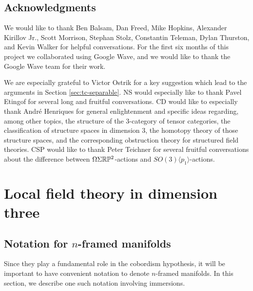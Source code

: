 \documentclass{amsart}
\begin{document}
\subsection*{Acknowledgments}

We would like to thank Ben Balsam, Dan Freed, Mike Hopkins, Alexander Kirillov Jr., Scott Morrison, Stephan Stolz, Constantin Teleman, Dylan Thurston, and Kevin Walker for helpful conversations.   For the first six months of this project we collaborated using Google Wave, and we would like to thank the Google Wave team for their work.  

We are especially grateful to Victor Ostrik for a key suggestion which lead to the arguments in Section \ref{sec:tc-separable}.  NS would especially like to thank Pavel Etingof for several long and fruitful conversations.  CD would like to especially thank Andr\'e Henriques for general enlightenment and specific ideas regarding, among other topics, the structure of the 3-category of tensor categories, the classification of structure spaces in dimension 3,  the homotopy theory of those structure spaces, and the corresponding obstruction theory for structured field theories.
CSP would like to thank Peter Teichner for several fruitful conversations about the difference between $\Omega \Sigma \mathbb R \mathbb P^2$-actions and $SO(3)\langle p_1 \rangle$-actions. 


\section{Local field theory in dimension three} \label{sec:lft}


\subsection{Notation for $n$-framed manifolds} 

Since they play a fundamental role in the cobordism hypothesis, it will be important to have convenient notation to denote $n$-framed manifolds.  In this section, we describe one such notation involving immersions.
\end{document}
